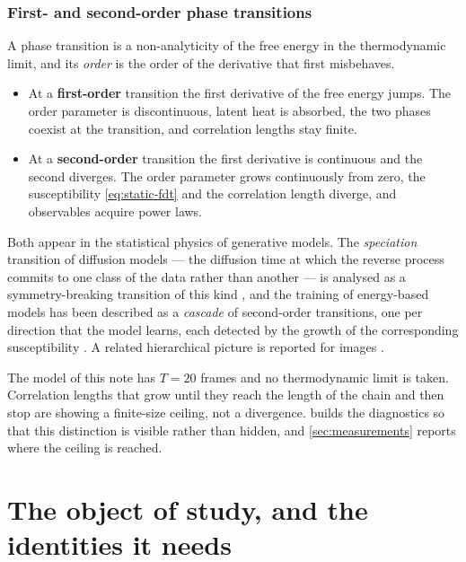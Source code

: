 \documentclass[11pt,a4paper]{article}
\begin{document}
\subsubsection{First- and second-order phase transitions}

A phase transition is a non-analyticity of the free energy in the thermodynamic limit, and its
\emph{order} is the order of the derivative that first misbehaves.

\begin{itemize}
\item At a \textbf{first-order} transition the first derivative of the free energy jumps. The
      order parameter is discontinuous, latent heat is absorbed, the two phases coexist at the
      transition, and correlation lengths stay finite.
\item At a \textbf{second-order} transition the first derivative is continuous and the second
      diverges. The order parameter grows continuously from zero, the susceptibility
      \eqref{eq:static-fdt} and the correlation length diverge, and observables acquire power
      laws.
\end{itemize}

Both appear in the statistical physics of generative models. The \emph{speciation} transition
of diffusion models --- the diffusion time at which the reverse process commits to one class
of the data rather than another --- is analysed as a symmetry-breaking transition of this kind
\citep{biroli2024dynamical,achilli2026speciation}, and the training of energy-based models has
been described as a \emph{cascade} of second-order transitions, one per direction that the
model learns, each detected by the growth of the corresponding susceptibility
\citep{bachtis2024cascade}. A related hierarchical picture is reported for images
\citep{sclocchi2025phase}.

\begin{caution}
The model of this note has $T=20$ frames and no thermodynamic limit is taken. Correlation
lengths that grow until they reach the length of the chain and then stop are showing a
finite-size ceiling, not a divergence.  builds the diagnostics so that
this distinction is visible rather than hidden, and \cref{sec:measurements} reports where the
ceiling is reached.
\end{caution}

\section{The object of study, and the identities it needs}\label{sec:object}
\end{document}
